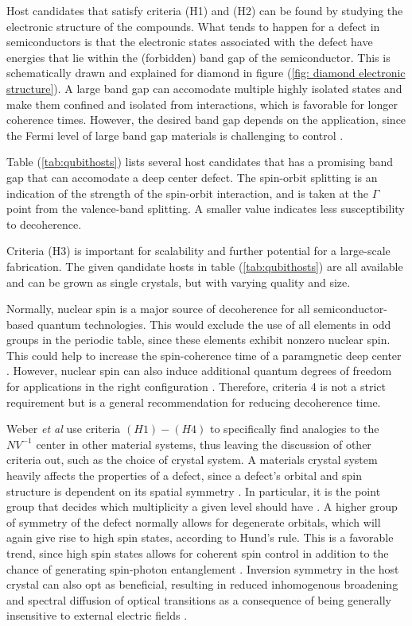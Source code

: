 Host candidates that satisfy criteria (H1) and (H2) can be found by studying the electronic structure of the compounds. What tends to happen for a defect in semiconductors is that the electronic states associated with the defect have energies that lie within the (forbidden) band gap of the semiconductor. This is schematically drawn and explained for diamond in figure (\ref{fig: diamond electronic structure}). A large band gap can accomodate multiple highly isolated states and make them confined and isolated from interactions, which is favorable for longer coherence times. However, the desired band gap depends on the application, since the Fermi level of large band gap materials is challenging to control \cite{Bassett2019}.

Table (\ref{tab:qubithosts}) lists several host candidates that has a promising band gap that can accomodate a deep center defect. The spin-orbit splitting is an indication of the strength of the spin-orbit interaction, and is taken at the $\Gamma$ point from the valence-band splitting. A smaller value indicates less susceptibility to decoherence.

Criteria (H3) is important for scalability and further potential for a large-scale fabrication. The given qandidate hosts in table (\ref{tab:qubithosts}) are all available and can be grown as single crystals, but with varying quality and size.

Normally, nuclear spin is a major source of decoherence for all semiconductor-based quantum technologies. This would exclude the use of all elements in odd groups in the periodic table, since these elements exhibit nonzero nuclear spin. This could help to increase the spin-coherence time of a paramgnetic deep center \cite{Weber2010}. However, nuclear spin can also induce additional quantum degrees of freedom for applications in the right configuration \cite{Bassett2019}. Therefore, criteria 4 is not a strict requirement but is a general recommendation for reducing decoherence time.  %

Weber \textit{et al} \cite{Weber2010} use criteria $(H1)-(H4)$ to specifically find analogies to the $NV^{-1}$ center in other material systems, thus leaving the discussion of other criteria out, such as the choice of crystal system. A materials crystal system heavily affects the properties of a defect, since a defect's orbital and spin structure is dependent on its spatial symmetry \cite{Bassett2019}. In particular, it is the point group that decides which multiplicity a given level should have \cite{James1976}. A higher group of symmetry of the defect normally allows for degenerate orbitals, which will again give rise to high spin states, according to Hund's rule. This is a favorable trend, since high spin states allows for coherent spin control in addition to the chance of generating spin-photon entanglement \cite{Bassett2019, Togan2010}. Inversion symmetry in the host crystal can also opt as beneficial, resulting in reduced inhomogenous broadening and spectral diffusion of optical transitions as a consequence of being generally insensitive to external electric fields \cite{Bassett2019}.

